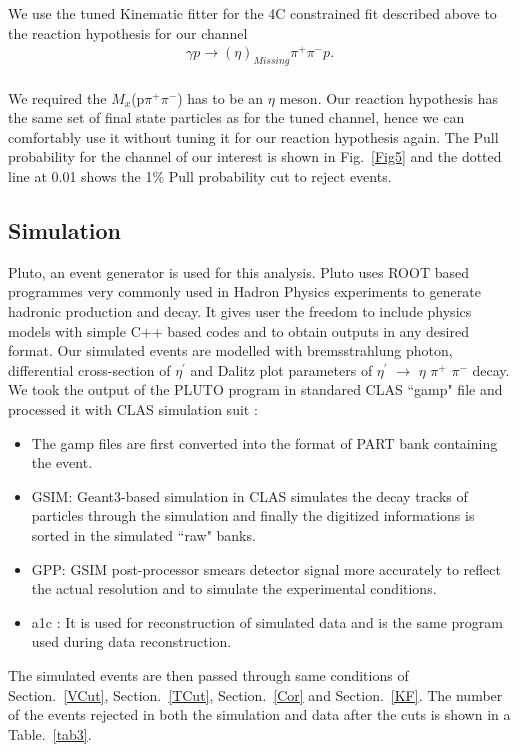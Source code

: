 \documentclass[12pt,a4paper]{amsbook}
\theoremstyle{definition}
\begin{document}
	We use the tuned Kinematic fitter for the 4C constrained fit described above to the reaction hypothesis for our channel 
\begin{eqnarray*}
\gamma p \rightarrow (\eta)_{Missing} \pi^{+} \pi^{-} p.
\end{eqnarray*}\\	
 We required the $M_{x}$(p$\pi^{+}$$\pi^{-}$) has to be an $\eta$ meson. Our reaction hypothesis has the same set of final state particles as for the tuned channel, hence we can comfortably use it without tuning it for our reaction hypothesis again. The Pull probability for the channel of our interest is shown in Fig.~\ref{Fig5} and the dotted line at 0.01 shows the 1$\%$ Pull probability cut to reject events. 
 

 
\subsection{Simulation}
Pluto, an event generator is used for this analysis. Pluto uses ROOT based programmes very commonly used in Hadron Physics experiments to generate hadronic production and decay. It gives user the freedom to include physics models with simple C++ based codes and to obtain outputs in any desired format. Our simulated events are modelled with bremsstrahlung photon, differential cross-section of $\eta^{\prime}$ and Dalitz plot parameters of $\eta^{\prime}$ $\rightarrow$ $\eta$ $\pi^{+}$ $\pi^{-}$ decay. We took the output of the PLUTO program in standared CLAS ``gamp" file and processed it with CLAS simulation suit :

\begin {itemize}
\item The gamp files are first converted into the format of PART bank containing the event.
\item GSIM:  Geant3-based simulation in CLAS simulates the decay tracks of particles through the simulation and finally the digitized informations is sorted in the simulated ``raw" banks.
\item GPP: GSIM post-processor smears detector signal more accurately to reflect the actual resolution and to simulate the experimental conditions.  
\item a1c : It is used for reconstruction of simulated data and is the same program used during data reconstruction.
\end {itemize}

The simulated events are then passed through same conditions of Section.~\ref{VCut}, Section.~\ref{TCut}, Section.~\ref{Cor} and Section.~\ref{KF}. The number of the events rejected in both the simulation and data after the cuts is shown in a Table.~\ref{tab3}. 
  
\end{document}
